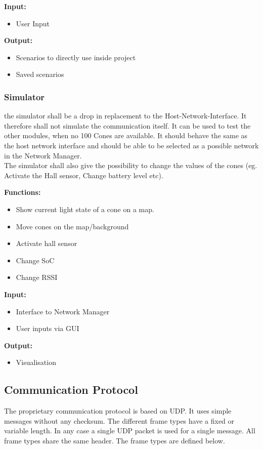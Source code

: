 \textbf{Input:}
\begin{itemize}
	\item User Input
\end{itemize}

\textbf{Output:}
\begin{itemize}
	\item Scenarios to directly use inside project
	\item Saved scenarios
\end{itemize}

\subsubsection{Simulator}
the simulator shall be a drop in replacement to the Host-Network-Interface. It therefore shall not simulate the communication itself. It can be used to test the other modules, when no 100 Cones are available. It should behave the same as the host network interface and should be able to be selected as a possible network in the Network Manager. \\
The simulator shall also give the possibility to change the values of the cones (eg. Activate the Hall sensor, Change battery level etc).

\textbf{Functions: }
\begin{itemize}
	\item Show current light state of a cone on a map. 
	\item Move cones on the map/background
	\item Activate hall sensor
	\item Change \ac{SoC}
	\item Change \ac{RSSI}
\end{itemize}

\textbf{Input:}
\begin{itemize}
	\item Interface to Network Manager
	\item User inputs via \ac{GUI}
\end{itemize}

\textbf{Output:}

\begin{itemize}
	\item Visualisation
\end{itemize}

\subsection{Communication Protocol}
\label{sec_communication}
The proprietary communication protocol is based on \ac{UDP}. It uses simple messages without any checksum.  The different frame types have a fixed or variable length. In any case a single \ac{UDP} packet is used for a single message. All frame types share the same header. The frame types are defined below.

